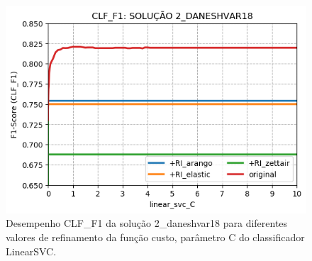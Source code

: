 \begin{figure}[h]
    \centering
    \caption{Desempenho CLF\_F1 da solução 2\_daneshvar18 para diferentes valores de refinamento da função custo, parâmetro C do classificador LinearSVC.}
    \vspace{-0.5cm}
    \begin{center}
        \includegraphics[scale=0.75]{img/clf-f1-2-daneshvar18.png}
    \end{center}
    \vspace{-0.5cm}
    \label{fig:clf-f1-2-daneshvar18}
\end{figure}